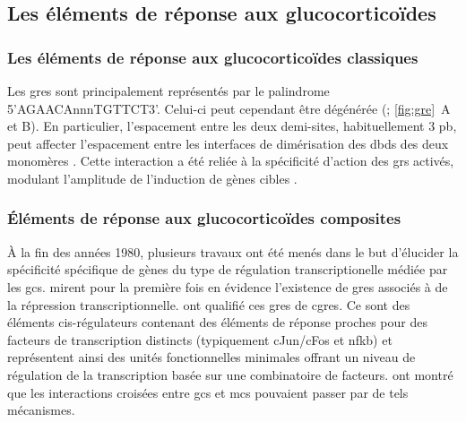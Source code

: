 \documentclass[../main.tex]{subfiles}
\begin{document}
\subsection{Les éléments de réponse aux glucocorticoïdes}

\subsubsection{Les éléments de réponse aux glucocorticoïdes classiques}
Les \glspl{gre} sont principalement représentés par le palindrome 5'AGAACAnnnTGTTCT3'.
Celui-ci peut cependant être dégénérée (\citealp{Nordeen1990}; \autoref{fig:gre}~A et B).
En particulier, l'espacement entre les deux demi-sites, habituellement 3 \gls{pb}, peut affecter l'espacement entre les interfaces de dimérisation des \glspl{dbd} des deux monomères \citep{Watson2013}.
Cette interaction a été reliée à la spécificité d'action des \glspl{gr} activés, modulant l'amplitude de l'induction de gènes cibles \citep{Meijsing2009}.
	


\subsubsection{Éléments de réponse aux glucocorticoïdes composites}
À la fin des années 1980, plusieurs travaux ont été menés dans le but d'élucider la spécificité spécifique de gènes du type de régulation transcriptionelle médiée par les \glspl{gc}.
\citet{Sakai1988} mirent pour la première fois en évidence l'existence de \glspl{gre} associés à de la répression transcriptionnelle.
\citet{Diamond1990} ont qualifié ces \glspl{gre} de \glspl{cgre}.
Ce sont des éléments cis-régulateurs contenant des éléments de réponse proches pour des facteurs de transcription distincts (typiquement cJun/cFos et \gls{nfkb}) et représentent ainsi des unités fonctionnelles minimales offrant un niveau de régulation de la transcription basée sur une combinatoire de facteurs.
\citet{Pearce1993} ont montré que les interactions croisées entre \glspl{gc} et \glspl{mc} pouvaient passer par de tels mécanismes.
\end{document}
